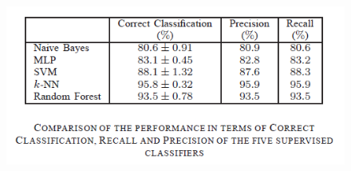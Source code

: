 \documentclass[11pt,a4paper,oneside]{article}
\begin{document}
\begin{figure} [h!]
	\begin{center}
		\includegraphics[scale=0.8]{5.png}
	\end{center}
\end{figure}











\end{document}

